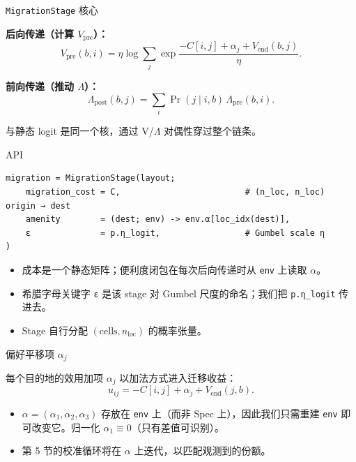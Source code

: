 \documentclass[10pt,aspectratio=169]{beamer}
\begin{document}
\begin{frame}{\texttt{MigrationStage} 核心}

\textbf{后向传递（计算 $V_{\text{pre}}$）：}
\[
V_{\text{pre}}(b, i) = \eta \log \sum_j \exp\!\frac{- C[i,j] + \alpha_j + V_{\text{end}}(b, j)}{\eta}.
\]

\textbf{前向传递（推动 $\Lambda$）：}
\[
\Lambda_{\text{post}}(b, j) = \sum_i \Pr(j \mid i, b)\, \Lambda_{\text{pre}}(b, i).
\]

\vspace{0.4em}

与静态 logit 是同一个核，通过 V/$\Lambda$ 对偶性穿过整个链条。

\end{frame}

\begin{frame}[fragile]{API}
\begin{lstlisting}
migration = MigrationStage(layout;
    migration_cost = C,                         # (n_loc, n_loc) origin → dest
    amenity        = (dest; env) -> env.α[loc_idx(dest)],
    ε              = p.η_logit,                 # Gumbel scale η
)
\end{lstlisting}

\vspace{0.4em}

\begin{itemize}
  \item 成本是一个静态矩阵；便利度闭包在每次后向传递时从 \texttt{env} 上读取 $\alpha$。
  \item 希腊字母关键字 \texttt{ε} 是该 stage 对 Gumbel 尺度的命名；我们把 \texttt{p.η\_logit} 传进去。
  \item Stage 自行分配 $(\text{cells}, n_{\text{loc}})$ 的概率张量。
\end{itemize}

\end{frame}

\begin{frame}{偏好平移项 $\alpha_j$}

每个目的地的效用加项 $\alpha_j$ 以加法方式进入迁移收益：
\[
u_{ij} = -C[i, j] + \alpha_j + V_{\text{end}}(j, b).
\]

\vspace{0.3em}

\begin{itemize}
  \item $\alpha = (\alpha_1, \alpha_2, \alpha_3)$ 存放在 \texttt{env} 上（而非 Spec 上），因此我们只需重建 \texttt{env} 即可改变它。归一化 $\alpha_1 \equiv 0$（只有差值可识别）。
  \item 第 5 节的校准循环将在 $\alpha$ 上迭代，以匹配观测到的份额。
\end{itemize}

\end{frame}
\end{document}
